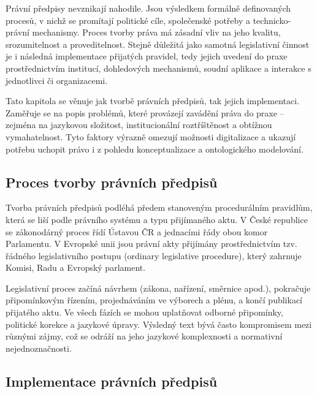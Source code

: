 Právní předpisy nevznikají nahodile. Jsou výsledkem formálně definovaných procesů, v nichž se promítají politické cíle, společenské potřeby a technicko-právní mechanismy. Proces tvorby práva má zásadní vliv na jeho kvalitu, srozumitelnost a proveditelnost. Stejně důležitá jako samotná legislativní činnost je i následná implementace přijatých pravidel, tedy jejich uvedení do praxe prostřednictvím institucí, dohledových mechanismů, soudní aplikace a interakce s jednotlivci či organizacemi. \cite{Sin2009}

Tato kapitola se věnuje jak tvorbě právních předpisů, tak jejich implementaci. Zaměřuje se na popis problémů, které provázejí zavádění práva do praxe – zejména na jazykovou složitost, institucionální roztříštěnost a obtížnou vymahatelnost. Tyto faktory výrazně omezují možnosti digitalizace a ukazují potřebu uchopit právo i z pohledu konceptualizace a ontologického modelování.


\subsection{Proces tvorby právních předpisů}
\label{sec:proces-tvorby}

Tvorba právních předpisů podléhá předem stanoveným procedurálním pravidlům, která se liší podle právního systému a typu přijímaného aktu. V České republice se zákonodárný proces řídí Ústavou ČR a jednacími řády obou komor Parlamentu. V Evropské unii jsou právní akty přijímány prostřednictvím tzv. řádného legislativního postupu (ordinary legislative procedure), který zahrnuje Komisi, Radu a Evropský parlament. \cite{Sin2009,Skop2019}

Legislativní proces začíná návrhem (zákona, nařízení, směrnice apod.), pokračuje připomínkovým řízením, projednáváním ve výborech a plénu, a končí publikací přijatého aktu. Ve všech fázích se mohou uplatňovat odborné připomínky, politické korekce a jazykové úpravy. Výsledný text bývá často kompromisem mezi různými zájmy, což se odráží na jeho jazykové komplexnosti a normativní nejednoznačnosti. \cite{Sin2009}


\subsection{Implementace právních předpisů}
\label{sec:implementace}

